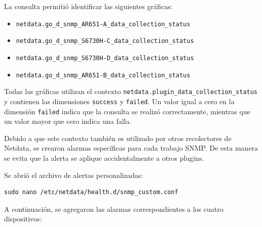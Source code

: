 La consulta permitió identificar las siguientes gráficas:

\begin{itemize}
    \item \texttt{netdata.go\_d\_snmp\_AR651-A\_data\_collection\_status}
    \item \texttt{netdata.go\_d\_snmp\_S6730H-C\_data\_collection\_status}
    \item \texttt{netdata.go\_d\_snmp\_S6730H-D\_data\_collection\_status}
    \item \texttt{netdata.go\_d\_snmp\_AR651-B\_data\_collection\_status}
\end{itemize}

Todas las gráficas utilizan el contexto \texttt{netdata.plugin\_data\_collection\_status} y contienen las dimensiones \texttt{success} y \texttt{failed}. Un valor igual a cero en la dimensión \texttt{failed} indica que la consulta se realizó correctamente, mientras que un valor mayor que cero indica una falla.

Debido a que este contexto también es utilizado por otros recolectores de Netdata, se crearon alarmas específicas para cada trabajo SNMP. De esta manera se evita que la alerta se aplique accidentalmente a otros plugins.

Se abrió el archivo de alertas personalizadas:

\begin{lstlisting}[style=terminal]
sudo nano /etc/netdata/health.d/snmp_custom.conf
\end{lstlisting}

A continuación, se agregaron las alarmas correspondientes a los cuatro dispositivos:

